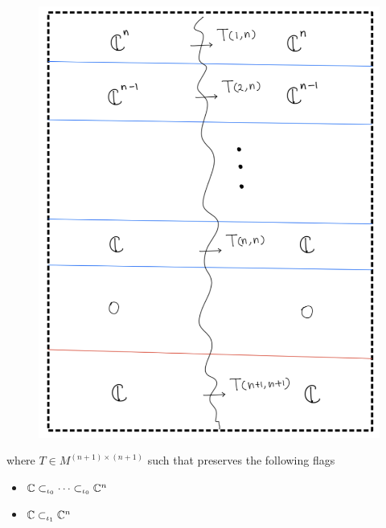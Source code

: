 \begin{figure}[H]
    \centering
    \includegraphics[scale = 0.95]{diagrams/cobord6/1.png}
    \caption{}
    \label{fig:your-label}
\end{figure}
where $T\in M^{(n+1)\times (n+1)}$ such that preserves the following flags
\begin{itemize}
\item $\mathbb{C} \subset_{\iota_0} \cdots \subset_{\iota_0} \mathbb{C}^n$
\item $\mathbb{C} \subset_{\iota_1} \mathbb{C}^n$
\end{itemize}


